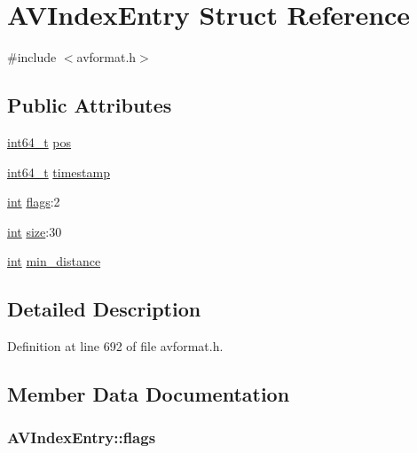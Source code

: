 \hypertarget{struct_a_v_index_entry}{}\section{A\+V\+Index\+Entry Struct Reference}
\label{struct_a_v_index_entry}


{\ttfamily \#include $<$avformat.\+h$>$}

\subsection*{Public Attributes}
\begin{DoxyCompactItemize}
\item 
\hyperlink{lib-src_2ffmpeg_2win32_2stdint_8h_a67a9885ef4908cb72ce26d75b694386c}{int64\+\_\+t} \hyperlink{struct_a_v_index_entry_ac0dd805ffd04bb52b1a358331dd10b98}{pos}
\item 
\hyperlink{lib-src_2ffmpeg_2win32_2stdint_8h_a67a9885ef4908cb72ce26d75b694386c}{int64\+\_\+t} \hyperlink{struct_a_v_index_entry_affef8bf4cd2f53a47ebc2d298d0d57c1}{timestamp}
\item 
\hyperlink{xmltok_8h_a5a0d4a5641ce434f1d23533f2b2e6653}{int} \hyperlink{struct_a_v_index_entry_a72366fb5dae7421e41cce6ad8dd2126b}{flags}\+:2
\item 
\hyperlink{xmltok_8h_a5a0d4a5641ce434f1d23533f2b2e6653}{int} \hyperlink{struct_a_v_index_entry_a1b57d93b863a1b605461229a65ca8b52}{size}\+:30
\item 
\hyperlink{xmltok_8h_a5a0d4a5641ce434f1d23533f2b2e6653}{int} \hyperlink{struct_a_v_index_entry_add3fa33e8b3363a96fa4c62fca1bcf42}{min\+\_\+distance}
\end{DoxyCompactItemize}


\subsection{Detailed Description}


Definition at line 692 of file avformat.\+h.



\subsection{Member Data Documentation}
\subsubsection[{\texorpdfstring{flags}{flags}}]{ A\+V\+Index\+Entry\+::flags}\hypertarget{struct_a_v_index_entry_a72366fb5dae7421e41cce6ad8dd2126b}{}\label{struct_a_v_index_entry_a72366fb5dae7421e41cce6ad8dd2126b}



